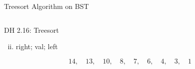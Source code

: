 \begin{frame}{}
  \centerline{\LARGE Treesort Algorithm on BST}

  \vspace{0.30cm}
\end{frame}

\begin{frame}{}
  \begin{columns}
      
      
  \end{columns}
\end{frame}

% 

\begin{frame}[fragile]{}
  \begin{exampleblock}{DH 2.16: Treesort}
    \begin{enumerate}[(i)]
      \setcounter{enumi}{1}
      \item right; \quad val; \quad left
    \end{enumerate}
  \end{exampleblock}

  \vspace{0.30cm}

  \pause
  \[
    14,\quad 13,\quad 10,\quad 8,\quad 7,\quad 6,\quad 4,\quad 3,\quad 1
  \]
\end{frame}
